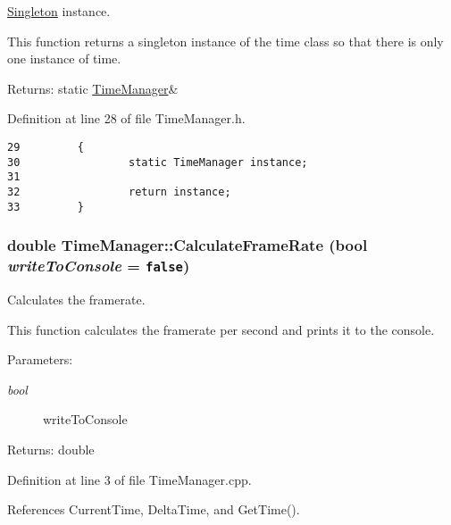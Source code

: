 \hyperlink{class_singleton}{Singleton} instance. 

This function returns a singleton instance of the time class so that there is only one instance of time.

\begin{Desc}
\item[Returns:]static \hyperlink{class_time_manager}{TimeManager}\& \end{Desc}


Definition at line 28 of file TimeManager.h.

\begin{Code}\begin{verbatim}29         {
30                 static TimeManager instance;
31                 
32                 return instance;
33         }
\end{verbatim}
\end{Code}


\hypertarget{class_time_manager_95782501e884a42904e2e726246701d5}{
\subsubsection[CalculateFrameRate]{\setlength{\rightskip}{0pt plus 5cm}double TimeManager::CalculateFrameRate (bool {\em writeToConsole} = {\tt false})}}
\label{class_time_manager_95782501e884a42904e2e726246701d5}


Calculates the framerate. 

This function calculates the framerate per second and prints it to the console.

\begin{Desc}
\item[Parameters:]
\begin{description}
\item[{\em bool}]writeToConsole \end{description}
\end{Desc}
\begin{Desc}
\item[Returns:]double \end{Desc}


Definition at line 3 of file TimeManager.cpp.

References CurrentTime, DeltaTime, and GetTime().


